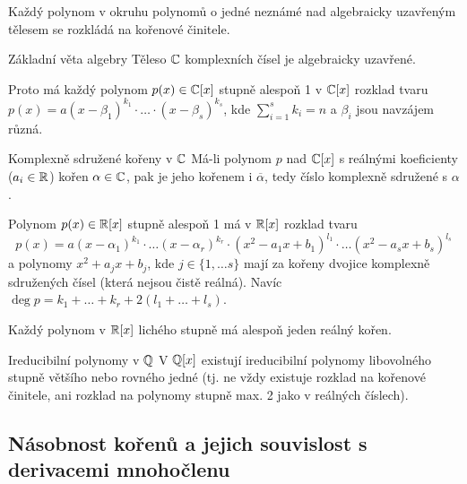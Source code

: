 \begin{poznamka}
Každý polynom v okruhu polynomů o jedné neznámé nad algebraicky uzavřeným tělesem se rozkládá na kořenové činitele.
\end{poznamka}

\begin{vetaN}{Základní věta algebry}
Těleso $\mathbb{C}$ komplexních čísel je algebraicky uzavřené.
\end{vetaN}

\begin{dusledek}
Proto má každý polynom $p(x)\in\mathbb{C}[x]$ stupně alespoň 1 v $\mathbb{C}[x]$ rozklad tvaru $p(x)=a(x-\beta_1)^{k_1}\cdot\dots\cdot(x-\beta_s)^{k_s}$, kde $\sum_{i=1}^s k_i=n$ a $\beta_i$ jsou navzájem různá.
\end{dusledek}

\begin{vetaN}{Komplexně sdružené kořeny v $\mathbb{C}$}
Má-li polynom $p$ nad $\mathbb{C}[x]$ s reálnými koeficienty ($a_i\in\mathbb{R}$) kořen $\alpha\in\mathbb{C}$, pak je jeho kořenem i $\overline{\alpha}$, tedy číslo komplexně sdružené s $\alpha$.
\end{vetaN}

\begin{dusledek}
Polynom $p(x)\in\mathbb{R}[x]$ stupně alespoň 1 má v $\mathbb{R}[x]$ rozklad tvaru 
$$p(x)=a(x-\alpha_1)^{k_1}\cdot\dots(x-\alpha_r)^{k_r}\cdot(x^2-a_1 x+b_1)^{l_1}\cdot\dots(x^2-a_s x+b_s)^{l_s}$$
a polynomy $x^2+a_j x+b_j$, kde $j\in\{1,\dots s\}$ mají za kořeny dvojice komplexně sdružených čísel (která nejsou čistě reálná). Navíc $\deg p=k_1+\dots+k_r+2(l_1+\dots+l_s)$.
\end{dusledek}

\begin{dusledek}
Každý polynom v $\mathbb{R}[x]$ lichého stupně má alespoň jeden reálný kořen.
\end{dusledek}

\begin{vetaN}{Ireducibilní polynomy v $\mathbb{Q}$}
V $\mathbb{Q}[x]$ existují ireducibilní polynomy libovolného stupně většího nebo rovného jedné (tj. ne vždy existuje rozklad na kořenové činitele, ani rozklad na polynomy stupně max. 2 jako v reálných číslech).
\end{vetaN}

\subsection{Násobnost kořenů a jejich souvislost s derivacemi mnohočlenu}

